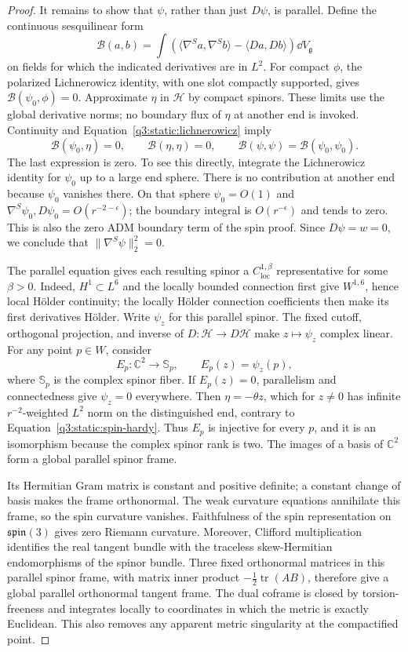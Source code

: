 \begin{proof}
It remains to show that \(\psi\), rather than just \(D\psi\), is
parallel. Define the continuous sesquilinear form
\[
\mathcal B(a,b)=
\int\left(\langle\nabla^Sa,\nabla^Sb\rangle
-\langle Da,Db\rangle\right)\dd V_{\mathfrak g}
\]
on fields for which the indicated derivatives are in \(L^2\).
For compact \(\phi\), the polarized Lichnerowicz identity,
with one slot compactly supported, gives
\(\mathcal B(\psi_0,\phi)=0\).
Approximate \(\eta\) in \(\mathcal H\) by compact spinors.
These limits use the global derivative norms; no boundary flux of
\(\eta\) at another end is invoked.
Continuity and Equation~\eqref{q3:static:lichnerowicz} imply
\[
\mathcal B(\psi_0,\eta)=0,\qquad
\mathcal B(\eta,\eta)=0,\qquad
\mathcal B(\psi,\psi)=\mathcal B(\psi_0,\psi_0).
\]
The last expression is zero. To see this directly, integrate the
Lichnerowicz identity for \(\psi_0\) up to a large end sphere.
There is no contribution at another end because \(\psi_0\)
vanishes there. On that sphere \(\psi_0=O(1)\) and
\(\nabla^S\psi_0,D\psi_0=O(r^{-2-\epsilon})\);
the boundary integral is \(O(r^{-\epsilon})\) and tends to zero.
This is also the zero ADM boundary term of the spin proof.
Since \(D\psi=w=0\), we conclude that
\(\|\nabla^S\psi\|_2^2=0\).

The parallel equation gives each resulting spinor a
\(C^{1,\beta}_{\mathrm{loc}}\) representative for some \(\beta>0\).
Indeed, \(H^1\subset L^6\) and the locally bounded connection first
give \(W^{1,6}\), hence local H\"older continuity; the locally H\"older
connection coefficients then make its first derivatives H\"older.
Write \(\psi_z\) for this parallel spinor. The fixed cutoff,
orthogonal projection, and inverse of \(D:\mathcal H\to D\mathcal H\)
make \(z\mapsto\psi_z\) complex linear.
For any point \(p\in W\), consider
\[
 E_p:\mathbb C^2\longrightarrow\mathbb S_p,
 \qquad E_p(z)=\psi_z(p),
\]
where \(\mathbb S_p\) is the complex spinor fiber.
If \(E_p(z)=0\), parallelism and connectedness give \(\psi_z=0\)
everywhere. Then \(\eta=-\theta z\), which for \(z\ne0\) has infinite
\(r^{-2}\)-weighted \(L^2\) norm on the distinguished end,
contrary to Equation~\eqref{q3:static:spin-hardy}.
Thus \(E_p\) is injective for every \(p\), and it is an isomorphism
because the complex spinor rank is two. The images of a basis of
\(\mathbb C^2\) form a global parallel spinor frame.

Its Hermitian Gram matrix is constant and positive definite;
a constant change of basis makes the frame orthonormal.
The weak curvature equations annihilate this frame, so the spin
curvature vanishes. Faithfulness of the spin representation on
\(\mathfrak{spin}(3)\) gives zero Riemann curvature.
Moreover, Clifford multiplication identifies the real tangent bundle
with the traceless skew-Hermitian endomorphisms of the spinor bundle.
Three fixed orthonormal matrices in this parallel spinor frame,
with matrix inner product \(-\tfrac12\operatorname{tr}(AB)\),
therefore give a global parallel orthonormal tangent frame.
The dual coframe is closed by torsion-freeness and integrates
locally to coordinates in which the metric is exactly Euclidean.
This also removes any apparent metric singularity at the
compactified point.


\end{proof}
